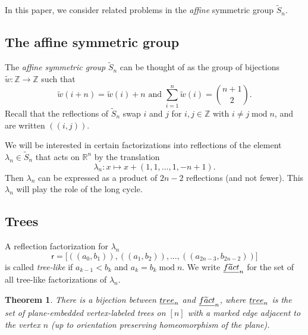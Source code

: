 \documentclass[a4paper,10pt,leqno]{amsart}
\newcommand{\darkred}{\color{darkred}}
\numberwithin{equation}{section}
\newtheorem{theorem}{Theorem}[section]
\theoremstyle{definition}
\theoremstyle{remark}
\newcommand{\T}{\textsc{tree}}
\newcommand{\Ft}{\textsc{f}\widetilde{\textsc{a}}\textsc{ct}}
\newcommand{\E}{\T}
\newcommand{\AS}{\widetilde{S}}
\newcommand{\EE}{\underline{\E}}
\newcommand{\EFt}{\underline{\Ft}}
\newcommand{\rrT}{\rr^T}
\newcommand{\ww}{\widetilde{w}}
\renewcommand{\mod}{\;\mathrm{mod}\;}
\newcommand{\rr}{\mathsf{r}}
\newcommand{\Trr}{T^\rr}
\newcommand{\defn}[1]{\emph{\darkred #1}}
\begin{document}
In this paper, we consider related problems in the \emph{affine} symmetric group $\AS_n$.

\subsection{The affine symmetric group}
The \defn{affine symmetric group} $\AS_{n}$ can be thought of as the group of bijections $\ww: \mathbb{Z} \to \mathbb{Z}$ such that~\cite[Chapter 8]{bjorner2005combinatorics}
\begin{equation}
\ww(i+n)=\ww(i)+n \text{ and } \sum_{i=1}^n \ww(i) = \binom{n+1}{2}.
\end{equation}
Recall that the reflections of $\AS_n$ swap $i$ and $j$ for $i,j \in \mathbb{Z}$ with $i \neq j \mod n$, and are written
$(\!(i,j)\!).$  

We will be interested in certain factorizations into reflections of the element $\lambda_n \in \AS_n$ that acts on $\mathbb{R}^n$ by the translation \[\lambda_n: x \mapsto x+(1,1,\ldots,1,-n+1).\]
Then $\lambda_n$ can be expressed as a product of $2n-2$ reflections (and not fewer).   This $\lambda_n$ will play the role of the long cycle.

\subsection{Trees}
A reflection factorization  for $\lambda_n$
  \[\rr =  \big[(\!(a_{0}, b_1)\!), (\!(a_{1}, b_2)\!),\ldots, (\!(a_{2n-3}, b_{2n-2})\!)\big]\]
   is called \defn{tree-like} if $a_{k-1} < b_k$ and $a_k = b_k \mod n$.
  We write $\EFt_n$ for the set of all tree-like factorizations of $\lambda_n$.
  
{
\renewcommand{\thetheorem}{\ref{thm:tree_like}}
\begin{theorem}
  There is a bijection between $\EE_n$ and $\EFt_n$, where $\EE_n$ is the set of plane-embedded vertex-labeled trees on $[n]$ with a marked edge adjacent to the vertex $n$ (up to orientation preserving homeomorphism of the plane).%
\end{theorem}
\addtocounter{theorem}{-1}
}
\end{document}
